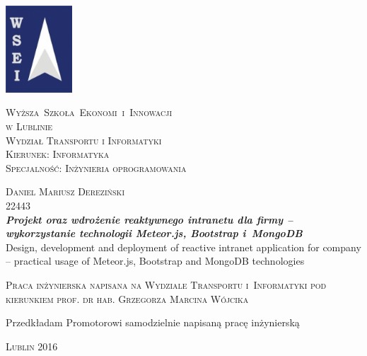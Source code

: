 \noindent

\begin{center}\small
\includegraphics[width=25mm]{./title/logowsei.jpg}
\end{center}

\begin{center}
{\LARGE\textsc{Wyższa~Szkoła~Ekonomi~i~Innowacji \\ w Lublinie}}\\[0.5cm]
{\Large\textsc{Wydział Transportu i Informatyki}}\\[0.5cm]
{\Large\textsc{Kierunek:  Informatyka}}\\[0.5cm]
{\Large\textsc{Specjalność: Inżynieria oprogramowania}}\\[0.5cm]
\end{center}


\begin{center}
\begin{large}
\textsc{Daniel Mariusz Dereziński} \\
22443 \\[0.5cm]

\huge{\bf{\it{Projekt oraz wdrożenie reaktywnego intranetu dla firmy -- wykorzystanie technologii Meteor.js, Bootstrap i~MongoDB}}} \\[0.3cm]
\small{Design, development and deployment of reactive intranet application for company -- practical usage of Meteor.js, Bootstrap and MongoDB technologies}
\end{large}
\end{center}
\vspace{2.0cm}



\begin{flushright}
\begin{minipage}{7.4cm}
\begin{spacing}{1.0}
\textsc{Praca inżynierska napisana na Wydziale Transportu i~Informatyki pod kierunkiem prof. dr hab. Grzegorza Marcina Wójcika}
\end{spacing}
\end{minipage}
\end{flushright}
\vfill

\begin{flushleft}
\vspace{-4.5cm}
\begin{minipage}{7.4cm}
\begin{spacing}{1.0}
\small{Przedkładam Promotorowi samodzielnie napisaną pracę inżynierską}
\end{spacing}
\end{minipage}
\end{flushleft}
\vspace{2.5cm}
\vfill

\begin{center}
\textsc{Lublin 2016}
\end{center}
